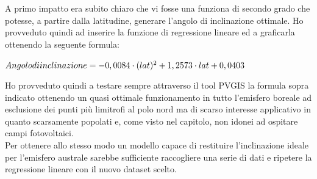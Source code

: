 A primo impatto era subito chiaro che vi fosse una funziona di secondo grado che potesse, a partire dalla latitudine, generare l'angolo di inclinazione ottimale. Ho provveduto quindi ad inserire la funzione di regressione lineare ed a graficarla ottenendo la seguente formula:
\begin{center}
    \large{$Angolo\space di\space inclinazione = -0,0084 \cdot (lat)^2 + 1,2573\cdot lat + 0,0403$}
\end{center}
\noindent
Ho provveduto quindi a testare sempre attraverso il tool PVGIS la formula sopra indicato ottenendo un quasi ottimale funzionamento in tutto l'emisfero boreale ad esclusione dei punti più limitrofi al polo nord ma di scarso interesse applicativo in quanto scarsamente popolati e, come visto nel capitolo, non idonei ad ospitare campi fotovoltaici.\\
Per ottenere allo stesso modo un modello capace di restituire l'inclinazione ideale per l'emisfero australe sarebbe sufficiente raccogliere una serie di dati e ripetere la regressione lineare con il nuovo dataset scelto.